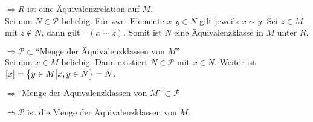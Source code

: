 \documentclass{scrreprt}
\begin{document}
$\Rightarrow R$ ist eine Äquivalenzrelation auf $M$. \\

\noindent
Sei nun $N \in \mathcal{P}$ beliebig.
Für zwei Elemente $x, y \in N$ gilt jeweils $x \sim y$.
Sei $z \in M$ mit $z \notin N$, dann gilt $\neg (x \sim z)$.
Somit ist $N$ eine Äquivalenzklasse in $M$ unter $R$.

$\Rightarrow \mathcal{P} \subset \text{``Menge der Äquivalenzklassen von $M$''}$
\\

\noindent
Sei nun $x \in M$ beliebig.
Dann existiert $N \in \mathcal{P}$ mit $x \in N$.
Weiter ist $\qty[x] = \qty\big{y \in M {\big |} x, y \in N} = N$.

$\Rightarrow \text{``Menge der Äquivalenzklassen von $M$''} \subset \mathcal{P}$

$\Rightarrow \mathcal{P}$ ist die Menge der Äquivalenzklassen von $M$.
\end{document}
